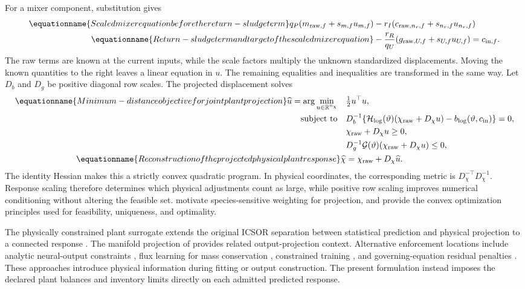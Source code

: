 For a mixer component, substitution gives
\begin{align}
\equationname{Scaled mixer equation before the return-sludge term}
q_P(m_{{\rm raw},f}+s_{m,f}u_{m,f})
&-r_I(c_{{\rm raw},n_r,f}+s_{n_r,f}u_{n_r,f})\\
\equationname{Return-sludge term and target of the scaled mixer equation}
&-\frac{r_R}{q_U}(g_{{\rm raw},U,f}+s_{U,f}u_{U,f})
=c_{{\rm in},f}.
\end{align}
The raw terms are known at the current inputs, while the scale factors multiply the unknown standardized displacements. Moving the known quantities to the right leaves a linear equation in $u$. The remaining equalities and inequalities are transformed in the same way. Let $D_b$ and $D_g$ be positive diagonal row scales. The projected displacement solves
\begin{align}
\equationname{Minimum-distance objective for joint plant projection}
\widehat u=\arg\min_{u\in\mathbb R^{n_\chi}}\quad&\tfrac12u^\top u,\\
\text{subject to}\quad&
D_b^{-1}\{\mathcal H_{\log}(\vartheta)(\chi_{\rm raw}+D_\chi u)
-b_{\log}(\vartheta,c_{\rm in})\}=0,\notag\\
&\chi_{\rm raw}+D_\chi u\ge0,\notag\\
&D_g^{-1}\mathcal G(\vartheta)(\chi_{\rm raw}+D_\chi u)\le0,\notag\\
\equationname{Reconstruction of the projected physical plant response}
\widehat\chi&=\chi_{\rm raw}+D_\chi\widehat u.
\label{eq:plant_joint_projection}
\end{align}
The identity Hessian makes this a strictly convex quadratic program. In physical coordinates, the corresponding metric is $D_\chi^{-\top}D_\chi^{-1}$. Response scaling therefore determines which physical adjustments count as large, while positive row scaling improves numerical conditioning without altering the feasible set. \citet{SturmSilva2024} motivate species-sensitive weighting for projection, and \citet{Boyd2004} provide the convex optimization principles used for feasibility, uniqueness, and optimality.

The physically constrained plant surrogate extends the original ICSOR separation between statistical prediction and physical projection to a connected response \citep{Selerio2026}. The manifold projection of \citet{Valente2025} provides related output-projection context. Alternative enforcement locations include analytic neural-output constraints \citep{Beucler2021}, flux learning for mass conservation \citep{SturmWexler2020}, constrained training \citep{Ruckstuhl2021}, and governing-equation residual penalties \citep{Li2024}. These approaches introduce physical information during fitting or output construction. The present formulation instead imposes the declared plant balances and inventory limits directly on each admitted predicted response.

